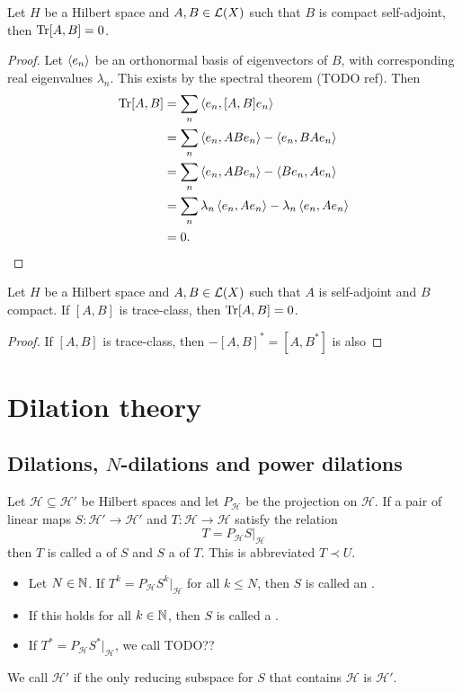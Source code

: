 \begin{proposition}
Let $H$ be a Hilbert space and $A,B\in\operatorname{\mathcal{L}}(X)$ such that $B$ is compact self-adjoint, then $\operatorname{Tr}[A,B] = 0$.
\end{proposition}
\begin{proof}
Let $\left\langle e_n \right\rangle$ be an orthonormal basis of eigenvectors of $B$, with corresponding real eigenvalues $\lambda_n$. This exists by the spectral theorem (TODO ref). Then
\begin{align*}
\operatorname{Tr}[A,B] &= \sum_n\left\langle e_n, [A,B]e_n \right\rangle \\
&= \sum_n\left\langle e_n, ABe_n \right\rangle - \left\langle e_n, BAe_n \right\rangle \\
&= \sum_n\left\langle e_n, ABe_n \right\rangle - \left\langle Be_n, Ae_n \right\rangle \\
&= \sum_n\lambda_n\left\langle e_n, Ae_n \right\rangle - \lambda_n\left\langle e_n, Ae_n \right\rangle \\
&= 0.
\end{align*}
\end{proof}
\begin{corollary}
Let $H$ be a Hilbert space and $A,B\in\operatorname{\mathcal{L}}(X)$ such that $A$ is self-adjoint and $B$ compact. If $[A,B]$ is trace-class, then $\operatorname{Tr}[A,B] = 0$.
\end{corollary}
\begin{proof}
If $[A,B]$ is trace-class, then $-[A,B]^* = [A,B^*]$ is also 
\end{proof}


\section{Dilation theory}
\subsection{Dilations, $N$-dilations and power dilations}
\begin{definition}
Let $\mathcal{H} \subseteq \mathcal{H}'$ be Hilbert spaces and let $P_\mathcal{H}$ be the projection on $\mathcal{H}$. If a pair of linear maps $S: \mathcal{H}'\to\mathcal{H}'$ and $T: \mathcal{H}\to \mathcal{H}$ satisfy the relation
\[ T = P_\mathcal{H} S |_\mathcal{H} \]
then $T$ is called a  of $S$ and $S$ a  of $T$. This is abbreviated $T\prec U$.

\begin{itemize}
\item Let $N\in\mathbb{N}$. If $T^k = P_\mathcal{H} S^k |_\mathcal{H}$ for all $k\leq N$, then $S$ is called an .
\item If this holds for all $k\in\mathbb{N}$, then $S$ is called a .
\item If $T^* = P_\mathcal{H} S^* |_\mathcal{H}$, we call TODO??
\end{itemize}
We call $\mathcal{H}'$  if the only reducing subspace for $S$ that contains $\mathcal{H}$ is $\mathcal{H}'$.
\end{definition}

